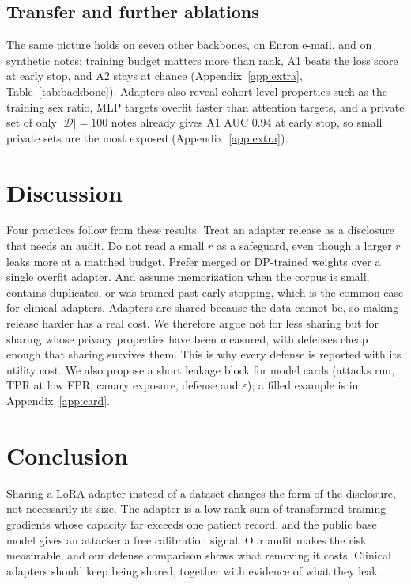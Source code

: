 \documentclass[11pt]{article}
\newcommand{\D}{\mathcal{D}}
\theoremstyle{plain}
\theoremstyle{definition}
\begin{document}
\subsection{Transfer and further ablations}
\label{sec:results_transfer}

The same picture holds on seven other backbones, on Enron e-mail, and on synthetic notes: training budget matters more than rank, A1 beats the loss score at early stop, and A2 stays at chance (Appendix~\ref{app:extra}, Table~\ref{tab:backbone}).
Adapters also reveal cohort-level properties such as the training sex ratio, MLP targets overfit faster than attention targets, and a private set of only $|\D|{=}100$ notes already gives A1 AUC $0.94$ at early stop, so small private sets are the most exposed (Appendix~\ref{app:extra}).

\section{Discussion}

Four practices follow from these results.
Treat an adapter release as a disclosure that needs an audit.
Do not read a small $r$ as a safeguard, even though a larger $r$ leaks more at a matched budget.
Prefer merged or DP-trained weights over a single overfit adapter.
And assume memorization when the corpus is small, contains duplicates, or was trained past early stopping, which is the common case for clinical adapters.
Adapters are shared because the data cannot be, so making release harder has a real cost.
We therefore argue not for less sharing but for sharing whose privacy properties have been measured, with defenses cheap enough that sharing survives them. This is why every defense is reported with its utility cost.
We also propose a short leakage block for model cards (attacks run, TPR at low FPR, canary exposure, defense and $\varepsilon$); a filled example is in Appendix~\ref{app:card}.

\section{Conclusion}

Sharing a LoRA adapter instead of a dataset changes the form of the disclosure, not necessarily its size.
The adapter is a low-rank sum of transformed training gradients whose capacity far exceeds one patient record, and the public base model gives an attacker a free calibration signal.
Our audit makes the risk measurable, and our defense comparison shows what removing it costs.
Clinical adapters should keep being shared, together with evidence of what they leak.
\end{document}
